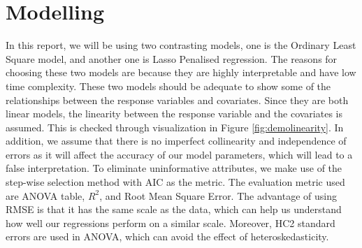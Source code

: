 \documentclass[11pt]{article}
\begin{document}
\section{Modelling}
In this report, we will be using two contrasting models, one is the Ordinary Least Square model, and another one is Lasso Penalised regression. The reasons for choosing these two models are because they are highly interpretable and have low time complexity. These two models should be adequate to show some of the relationships between the response variables and covariates. Since they are both linear models, the linearity between the response variable and the covariates is assumed. This is checked through visualization in Figure \ref{fig:demolinearity}. In addition, we assume that there is no imperfect collinearity and independence of errors as it will affect the accuracy of our model parameters, which will lead to a false interpretation. To eliminate uninformative attributes, we make use of the step-wise selection method with AIC as the metric. The evaluation metric used are ANOVA table, $R^2$, and Root Mean Square Error. The advantage of using RMSE is that it has the same scale as the data, which can help us understand how well our regressions perform on a similar scale. Moreover, HC2 standard errors are used in ANOVA, which can avoid the effect of heteroskedasticity.
\end{document}
